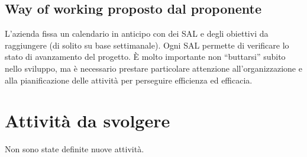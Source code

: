 \documentclass{article}
\begin{document}
    \subsection{Way of working proposto dal proponente}
        L’azienda fissa un calendario in anticipo con dei SAL e degli obiettivi da raggiungere (di solito su base settimanale).
        Ogni SAL permette di verificare lo stato di avanzamento del progetto.
        È molto importante non “buttarsi” subito nello sviluppo, ma è necessario prestare particolare attenzione all’organizzazione e alla pianificazione delle attività per perseguire efficienza ed efficacia.

\section{Attività da svolgere}
    Non sono state definite nuove attività.
\end{document}
